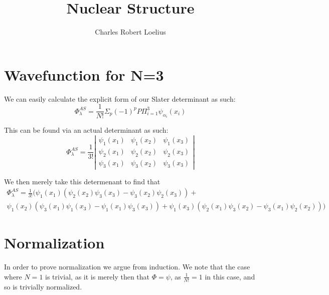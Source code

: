\documentclass[11pt]{article} %
\title{Nuclear Structure}
\author{Charles Robert Loelius}
\begin{document}
\maketitle


\section{Wavefunction for N=3}

We can easily calculate the explicit form of our Slater determinant as such:\\

\begin{equation}
\Phi^{AS}_\lambda =\frac{1}{N!} \Sigma_p (-1)^p P \Pi_{i=1}^3 \psi_{\alpha_i}(x_i)
\end{equation}

This can be found via an actual determinant as such:\\
\begin{equation}
\Phi^{AS}_\lambda = \frac{1}{3!} \left| \begin{array}{ccc}
\psi_1 (x_1) & \psi_1 (x_2) & \psi_1(x_3) \\
\psi_2(x_1) & \psi_2(x_2) & \psi_2(x_3) \\
\psi_3(x_1) & \psi_3(x_2) & \psi_3(x_3)  \end{array}\right|
\end{equation}

We then merely take this determenant to find that\\

\begin{equation}
\begin{split}
\Phi^{AS}_\lambda =\frac{1}{3!}(\psi_1(x_1)(\psi_2(x_2)\psi_3(x_3)-\psi_3(x_2)\psi_2(x_3))+ \\ \psi_1(x_2)(\psi_3(x_1)\psi_1(x_3)-\psi_1(x_1)\psi_3(x_3))+\psi_1(x_3)(\psi_2(x_1)\psi_3(x_2)-\psi_3(x_1)\psi_2(x_2)))
\end{split}
\end{equation}

\section{Normalization}

In order to prove normalization we argue from induction. We note that the case where $N=1$ is trivial, as it is merely then that $\Phi=\psi$, as $\frac{1}{N!}=1$ in this case, and so is trivially normalized.\\
\end{document}
